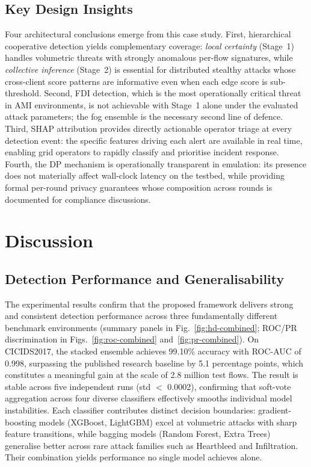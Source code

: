 \documentclass[sensors,article,submit,pdftex,moreauthors]{Definitions/mdpi}
\begin{document}
\subsection{Key Design Insights}

Four architectural conclusions emerge from this case study. First, hierarchical cooperative detection yields complementary coverage: \textit{local certainty} (Stage~1) handles volumetric threats with strongly anomalous per-flow signatures, while \textit{collective inference} (Stage~2) is essential for distributed stealthy attacks whose cross-client score patterns are informative even when each edge score is sub-threshold. Second, FDI detection, which is the most operationally critical threat in AMI environments, is not achievable with Stage~1 alone under the evaluated attack parameters; the fog ensemble is the necessary second line of defence. Third, SHAP attribution provides directly actionable operator triage at every detection event: the specific features driving each alert are available in real time, enabling grid operators to rapidly classify and prioritise incident response. Fourth, the DP mechanism is operationally transparent in emulation: its presence does not materially affect wall-clock latency on the testbed, while providing formal per-round privacy guarantees whose composition across rounds is documented for compliance discussions.

\section{Discussion}\label{r9}

\subsection{Detection Performance and Generalisability}

The experimental results confirm that the proposed framework delivers strong and consistent detection performance across three fundamentally different benchmark environments (summary panels in Fig.~\ref{fig:hd-combined}; ROC/PR discrimination in Figs.~\ref{fig:roc-combined} and~\ref{fig:pr-combined}). On CICIDS2017, the stacked ensemble achieves 99.10\% accuracy with ROC-AUC of 0.998, surpassing the published research baseline by 5.1 percentage points, which constitutes a meaningful gain at the scale of 2.8 million test flows. The result is stable across five independent runs (std $<$ 0.0002), confirming that soft-vote aggregation across four diverse classifiers effectively smooths individual model instabilities. Each classifier contributes distinct decision boundaries: gradient-boosting models (XGBoost, LightGBM) excel at volumetric attacks with sharp feature transitions, while bagging models (Random Forest, Extra Trees) generalise better across rare attack families such as Heartbleed and Infiltration. Their combination yields performance no single model achieves alone.
\end{document}
